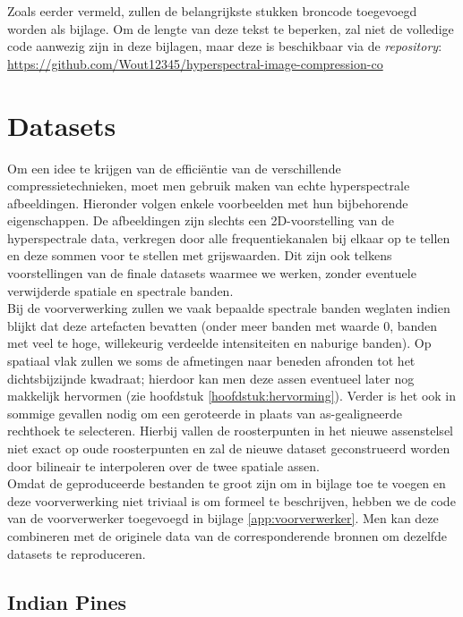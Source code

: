 Zoals eerder vermeld, zullen de belangrijkste stukken broncode toegevoegd worden als bijlage. Om de lengte van deze tekst te beperken, zal niet de volledige code aanwezig zijn in deze bijlagen, maar deze is beschikbaar via de \textit{repository}: \url{https://github.com/Wout12345/hyperspectral-image-compression-co}

\section{Datasets}

Om een idee te krijgen van de effici\"entie van de verschillende compressietechnieken, moet men gebruik maken van echte hyperspectrale afbeeldingen. Hieronder volgen enkele voorbeelden met hun bijbehorende eigenschappen. De afbeeldingen zijn slechts een 2D-voorstelling van de hyperspectrale data, verkregen door alle frequentiekanalen bij elkaar op te tellen en deze sommen voor te stellen met grijswaarden. Dit zijn ook telkens voorstellingen van de finale datasets waarmee we werken, zonder eventuele verwijderde spatiale en spectrale banden.\\

Bij de voorverwerking zullen we vaak bepaalde spectrale banden weglaten indien blijkt dat deze artefacten bevatten (onder meer banden met waarde 0, banden met veel te hoge, willekeurig verdeelde intensiteiten en naburige banden). Op spatiaal vlak zullen we soms de afmetingen naar beneden afronden tot het dichtsbijzijnde kwadraat; hierdoor kan men deze assen eventueel later nog makkelijk hervormen (zie hoofdstuk \ref{hoofdstuk:hervorming}). Verder is het ook in sommige gevallen nodig om een geroteerde in plaats van as-gealigneerde rechthoek te selecteren. Hierbij vallen de roosterpunten in het nieuwe assenstelsel niet exact op oude roosterpunten en zal de nieuwe dataset geconstrueerd worden door bilineair te interpoleren \cite{ref:bilinear_interpolation} over de twee spatiale assen.\\

Omdat de geproduceerde bestanden te groot zijn om in bijlage toe te voegen en deze voorverwerking niet triviaal is om formeel te beschrijven, hebben we de code van de voorverwerker toegevoegd in bijlage \ref{app:voorverwerker}. Men kan deze combineren met de originele data van de corresponderende bronnen om dezelfde datasets te reproduceren.

\subsection{Indian Pines}

